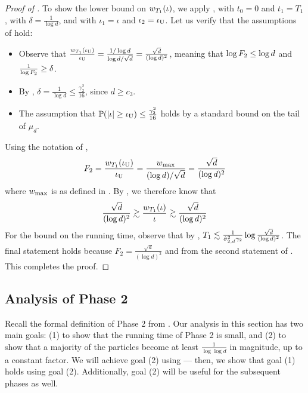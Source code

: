 \begin{proof}[Proof of ]
To show the lower bound on $w_{T_1}(\iota)$, we apply , with $t_0 = 0$ and $t_1 = T_1$, with $\delta = \frac{1}{\log d}$, and with $\iota_1 = \iota$ and $\iota_2 = \iota_{\textup{U}}$. Let us verify that the assumptions of  hold:
\begin{itemize}
    \item Observe that $\frac{w_{T_1}(\iota_{\textup{U}})}{\iota_{\textup{U}}} = \frac{1/\log d}{\log d / \sqrt{d}} = \frac{\sqrt{d}}{(\log d)^2}$, meaning that $\log F_2 \leq \log d$ and $\frac{1}{\log F_2} \geq \delta$.
    \item By , $\delta = \frac{1}{\log d} \leq \frac{\gamma_2^2}{16}$, since $d \geq c_3$.
    \item The assumption that $\mathbb{P}(|\iota| \geq \iota_{\textup{U}}) \leq \frac{\gamma_2^2}{16}$ holds by a standard bound on the tail of $\mu_d$.
\end{itemize}
Using the notation of ,
\begin{align}
F_2
= \frac{w_{T_1}(\iota_{\textup{U}})}{\iota_{\textup{U}}}
= \frac{{w_{\textup{max}}}}{(\log d)/\sqrt{d}}
= \frac{\sqrt{d}}{(\log d)^2}
\end{align}
where ${w_{\textup{max}}}$ is as defined in . By , we therefore know that
\begin{align}
\frac{\sqrt{d}}{(\log d)^2}
\gtrsim \frac{w_{T_1}(\iota)}{\iota} 
\gtrsim \frac{\sqrt{d}}{(\log d)^2}
\end{align}
For the bound on the running time, observe that by , $T_1 \lesssim \frac{1}{\hat{\sigma}_{2, d}^2 \gamma_2} \log \frac{\sqrt{d}}{(\log d)^2}$. The final statement holds because $F_2 = \frac{\sqrt{d}}{(\log d)^2}$ and from the second statement of . This completes the proof.
\end{proof}

\subsection{Analysis of Phase 2}

Recall the formal definition of Phase 2 from . Our analysis in this section has two main goals: (1) to show that the running time of Phase 2 is small, and (2) to show that a majority of the particles become at least $\frac{1}{\log \log d}$ in magnitude, up to a constant factor. We will achieve goal (2) using  --- then, we show that goal (1) holds using goal (2). Additionally, goal (2) will be useful for the subsequent phases as well.

